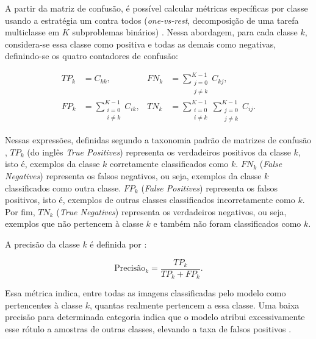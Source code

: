 \documentclass[
    12pt,
    openright,
    oneside,
    a4paper,
    english,
    brazil
]{abntex2}
\begin{document}
A partir da matriz de confusão, é possível calcular métricas específicas por classe usando a estratégia um contra todos (\textit{one-vs-rest}, decomposição de uma tarefa multiclasse em \(K\) subproblemas binários) \cite{fawcett2006roc,hand2001simple}. Nessa abordagem, para cada classe \(k\), considera-se essa classe como positiva e todas as demais como negativas, definindo-se os quatro contadores de confusão:

\begin{equation}
\label{eq:matriz_confusao_ovr}
\begin{aligned}
TP_k &= C_{kk}, &
FN_k &= \sum_{\substack{j=0 \\ j \neq k}}^{K-1} C_{kj}, \\
FP_k &= \sum_{\substack{i=0 \\ i \neq k}}^{K-1} C_{ik}, &
TN_k &= \sum_{\substack{i=0 \\ i \neq k}}^{K-1} \sum_{\substack{j=0 \\ j \neq k}}^{K-1} C_{ij}.
\end{aligned}
\end{equation}

Nessas expressões, definidas segundo a taxonomia padrão de matrizes de confusão \cite{fawcett2006roc,sokolova2009systematic}, \(TP_k\) (do inglês \textit{True Positives}) representa os verdadeiros positivos da classe \(k\), isto é, exemplos da classe \(k\) corretamente classificados como \(k\). \(FN_k\) (\textit{False Negatives}) representa os falsos negativos, ou seja, exemplos da classe \(k\) classificados como outra classe. \(FP_k\) (\textit{False Positives}) representa os falsos positivos, isto é, exemplos de outras classes classificados incorretamente como \(k\). Por fim, \(TN_k\) (\textit{True Negatives}) representa os verdadeiros negativos, ou seja, exemplos que não pertencem à classe \(k\) e também não foram classificados como \(k\).

A precisão da classe \(k\) é definida por \cite{fawcett2006roc,johnson2019survey,sokolova2009systematic}:

\begin{equation}
\label{eq:precisao}
\text{Precisão}_k =
\frac{TP_k}{TP_k + FP_k}.
\end{equation}

Essa métrica indica, entre todas as imagens classificadas pelo modelo como pertencentes à classe \(k\), quantas realmente pertencem a essa classe. Uma baixa precisão para determinada categoria indica que o modelo atribui excessivamente esse rótulo a amostras de outras classes, elevando a taxa de falsos positivos \cite{fawcett2006roc,sokolova2009systematic}.
\end{document}

